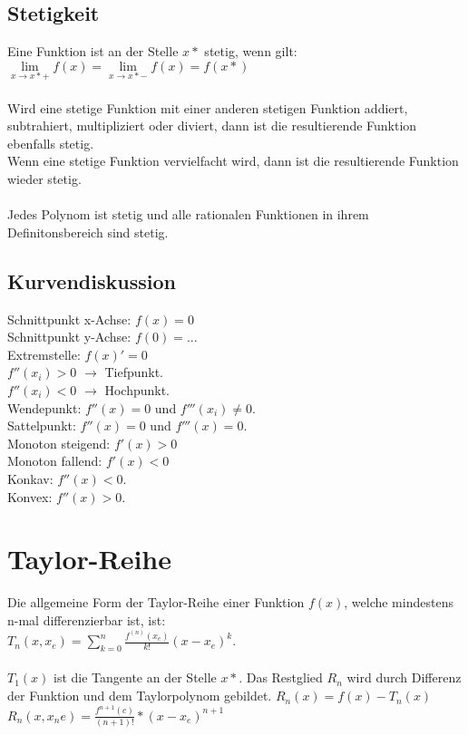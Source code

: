 \documentclass[a4paper,landscape, 11pt]{article}
\newcommand{\limFromTo}[2]{ \lim\limits_{#2 \rightarrow #1}}
\begin{document}
\begin{multicols}{4}
\begin{small}
              \subsection{Stetigkeit}
                  Eine Funktion ist an der Stelle $x*$ stetig, wenn gilt:\\
                  $\limFromTo{x*+}{x} f(x) = \limFromTo{x*-}{x} f(x) = f(x*)$
                  \\ \\
                  Wird eine stetige Funktion mit einer anderen stetigen Funktion addiert, subtrahiert, multipliziert oder diviert, dann ist die resultierende Funktion ebenfalls stetig.\\
                  Wenn eine stetige Funktion vervielfacht wird, dann ist die resultierende Funktion wieder stetig. \\
                  \\
                  Jedes Polynom ist stetig und alle rationalen Funktionen in ihrem Definitonsbereich sind stetig.
                                    
              \subsection{Kurvendiskussion}
                  Schnittpunkt x-Achse: $f(x) = 0$ \\
                  Schnittpunkt y-Achse:  $f(0) = ...$\\
                  Extremstelle: $f(x)' = 0$  \\
                  $f''(x_i) > 0$ $\rightarrow$ Tiefpunkt.\\
                  $f''(x_i) < 0$ $\rightarrow$ Hochpunkt. \\
                  Wendepunkt: $f''(x) = 0$ und $f'''(x_i) \neq 0$. \\
                  Sattelpunkt: $f''(x) = 0$ und $f'''(x) = 0$. \\
                  Monoton steigend: $f'(x) > 0$ \\
                  Monoton fallend: $f'(x) < 0$ \\
                  Konkav: $f''(x) < 0$.\\
                  Konvex: $f''(x) > 0$.
                   	 
    \section{Taylor-Reihe}
        Die allgemeine Form der Taylor-Reihe einer Funktion $f(x)$, welche mindestens n-mal differenzierbar ist, ist: \\
        $T_n(x, x_e) = \sum_{k=0}^{n} \frac{f^{(n)}(x_e)}{k!}(x - x_e)^k$.
        \\ \\
        $T_1(x)$ ist die Tangente an der Stelle $x*$.
        Das Restglied $R_n$ wird durch Differenz der Funktion und dem Taylorpolynom gebildet. $R_n(x) = f(x) - T_n(x)$
        $R_n(x,x_ne) = \frac{f^{n+1}(c)}{(n+1)!}*(x-x_e)^{n+1} $
        

\end{small}
\end{multicols}
\end{document}
